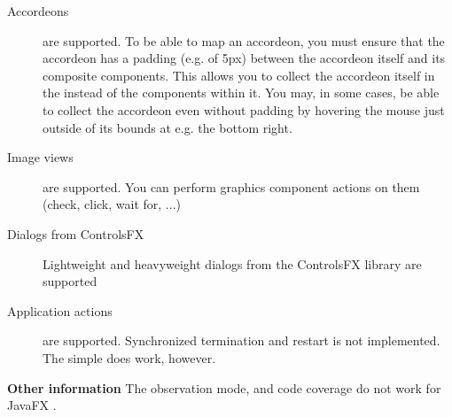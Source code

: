\begin{description}
\item [Accordeons]{are supported. To be able to map an accordeon, you must ensure that the accordeon has a padding (e.g. of 5px) between the accordeon itself and its composite components. This allows you to collect the accordeon itself in the \gdomm{} instead of the components within it. You may, in some cases, be able to collect the accordeon even without padding by hovering the mouse just outside of its bounds at e.g. the bottom right.}
\item [Image views]{are supported. You can perform graphics component actions on them (check, click, wait for, ...)}
\item [Dialogs from ControlsFX]{Lightweight and heavyweight dialogs from the ControlsFX library are supported}
\item [Application actions]{are supported. Synchronized termination and restart is not implemented. The simple  does work, however.}
\end{description}

\textbf{Other information}
The observation mode,  and code coverage do not work for JavaFX \gdauts{}. 
